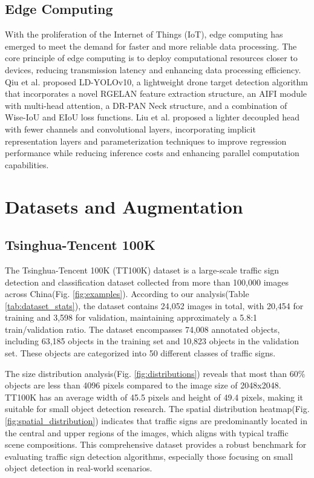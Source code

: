 \documentclass[10pt]{article}
\begin{document}
\subsection{Edge Computing}
With the proliferation of the Internet of Things (IoT), edge computing has emerged to meet the demand for faster and more reliable data processing. The core principle of edge computing is to deploy computational resources closer to devices, reducing transmission latency and enhancing data processing efficiency.
Qiu et al.\cite{electronics13163269} proposed LD-YOLOv10, a lightweight drone target detection algorithm that incorporates a novel RGELAN feature extraction structure, an AIFI module with multi-head attention, a DR-PAN Neck structure, and a combination of Wise-IoU and EIoU loss functions.
Liu et al.\cite{liu2023edgeyolo} proposed a lighter decoupled head with fewer channels and convolutional layers, incorporating implicit representation layers and parameterization techniques to improve regression performance while reducing inference costs and enhancing parallel computation capabilities.

\section{Datasets and Augmentation}

\subsection{Tsinghua-Tencent 100K}

The Tsinghua-Tencent 100K (TT100K) dataset is a large-scale traffic sign detection and classification dataset collected from more than 100,000 images across China(Fig. \ref{fig:examples}). According to our analysis(Table \ref{tab:dataset_stats}), the dataset contains 24,052 images in total, with 20,454 for training and 3,598 for validation, maintaining approximately a 5.8:1 train/validation ratio. The dataset encompasses 74,008 annotated objects, including 63,185 objects in the training set and 10,823 objects in the validation set. These objects are categorized into 50 different classes of traffic signs.

The size distribution analysis(Fig. \ref{fig:distributions}) reveals that most than 60\% objects are less than 4096 pixels compared to the image size of 2048x2048. TT100K has an average width of 45.5 pixels and height of 49.4 pixels, making it suitable for small object detection research. The spatial distribution heatmap(Fig. \ref{fig:spatial_distribution}) indicates that traffic signs are predominantly located in the central and upper regions of the images, which aligns with typical traffic scene compositions. This comprehensive dataset provides a robust benchmark for evaluating traffic sign detection algorithms, especially those focusing on small object detection in real-world scenarios.
\end{document}
